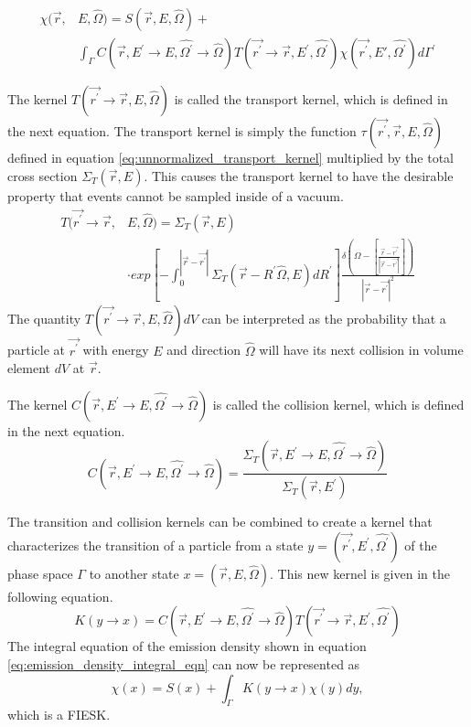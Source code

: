 \begin{equation}
  \begin{split}
    \chi(\vec{r},&E,\hat{\Omega}) = S(\vec{r},E,\hat{\Omega}) + \\
    &\int_{\Gamma}C(\vec{r},E^{'} \to E,\hat{\Omega^{'}} \to \hat{\Omega})
    T(\vec{r^{'}} \to \vec{r},E^{'},\hat{\Omega^{'}}) 
    \chi(\vec{r^{'}},E',\hat{\Omega^{'}}) d\Gamma^{'}
  \end{split}
  \label{eq:emission_density_integral_eqn}
\end{equation}

The kernel $T(\vec{r^{'}} \to \vec{r},E,\hat{\Omega})$ is called the transport
kernel, which is defined in the next equation. The transport kernel is simply
the function $\tau(\vec{r^{'}},\vec{r},E,\hat{\Omega})$ defined in equation 
\ref{eq:unnormalized_transport_kernel} multiplied by the total cross section
$\Sigma_T(\vec{r},E)$. This causes the transport kernel to have the desirable
property that events cannot be sampled inside of a vacuum.
\begin{equation}
  \begin{split}
    T(\vec{r^{'}} \to \vec{r},&E,\hat{\Omega}) = \Sigma_T(\vec{r},E) \\
    &\cdot exp\left[-\int_0^{|\vec{r} - \vec{r^{'}}|} 
      \Sigma_T(\vec{r}-R^{'}\hat{\Omega},E)dR^{'} \right] 
    \frac{\delta \left(\Omega - \left[\frac{\vec{r} - \vec{r^{'}}}
        {|\vec{r} - \vec{r^{'}}|}\right]\right)}
    {|\vec{r} - \vec{r^{'}}|^2} 
  \end{split}
\end{equation}
The quantity $T(\vec{r^{'}} \to \vec{r},E,\hat{\Omega})dV$ can be interpreted
as the probability that a particle at $\vec{r^{'}}$ with energy $E$ and 
direction $\hat{\Omega}$ will have its next collision in volume element $dV$
at $\vec{r}$.  

The kernel $C(\vec{r},E^{'} \to E,\hat{\Omega^{'}} \to \hat{\Omega})$ is called
the collision kernel, which is defined in the next equation.
\begin{equation}
  C(\vec{r},E^{'} \to E,\hat{\Omega^{'}} \to \hat{\Omega}) = 
  \frac{\Sigma_T(\vec{r},E^{'} \to E,\hat{\Omega^{'}} \to \hat{\Omega})}
       {\Sigma_T(\vec{r},E^{'})}
\end{equation}

The transition and collision kernels can be combined to create a kernel that
characterizes the transition of a particle from a state 
$y = (\vec{r^{'}},E^{'},\hat{\Omega^{'}})$ of the phase space $\Gamma$ to another 
state $x = (\vec{r},E,\hat{\Omega})$. This new kernel is given in the following 
equation.
\begin{equation}
  K(y \to x) =
  C(\vec{r},E^{'} \to E,\hat{\Omega^{'}} \to \hat{\Omega})
    T(\vec{r^{'}} \to \vec{r},E^{'},\hat{\Omega^{'}})
\end{equation}
The integral equation of the emission density shown in equation 
\ref{eq:emission_density_integral_eqn} can now be represented as
\begin{equation*}
  \chi(x) = S(x) + \int_{\Gamma} K(y \to x)\chi(y)dy,
\end{equation*}
which is a FIESK. 

